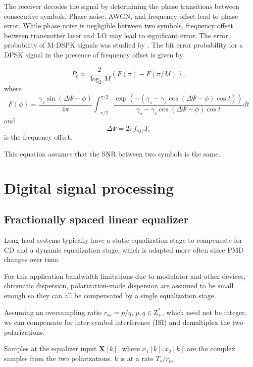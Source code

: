 \documentclass[a4paper]{article}
\begin{document}
The receiver decodes the signal by determining the phase transitions between consecutive symbols. Phase noise, AWGN, and frequency offset lead to phase error. While phase noise is negligible between two symbols, frequency offset between transmitter laser and LO may lead to significant error. The error probability of M-DSPK signals was studied by \cite{Pawula2001}. The bit error probability for a DPSK signal in the presence of frequency offset is given by

\begin{equation}
P_e \approx \frac{2}{\log_2M}(F(\pi) - F(\pi/M)),
\end{equation}
where
\begin{equation}
F(\phi) = \frac{\gamma_s\sin(\Delta\Psi-\phi)}{4\pi}\int_{-\pi/2}^{\pi/2} \frac{\exp(-(\gamma_s -\gamma_s\cos(\Delta\Psi - \phi)\cos t))}{\gamma_s -\gamma_s\cos(\Delta\Psi - \phi)\cos t}dt
\end{equation}
and 
\begin{equation}
\Delta\Psi = 2\pi f_{off}T_s
\end{equation}
is the frequency offset.

This equation assumes that the SNR between two symbols is the same.



\section{Digital signal processing}

\subsection{Fractionally spaced linear equalizer}

Long-haul systems typically have a static equalization stage to compensate for CD and a dynamic equalization stage, which is adapted more often since PMD changes over time.

For this application bandwidth limitations due to modulator and other devices, chromatic dispersion, polarization-mode dispersion are assumed to be small enough so they can all be compensated by a single equalization stage. 

Assuming an oversampling ratio $r_{os} = p/q$, $p, q \in \mathrm{Z^*_+}$, which need not be integer, we can compensate for inter-symbol interference (ISI) and demultiplex the two polarizations.

Samples at the equalizer input $\bm{X}[k]$, where $x_1[k], x_2[k]$ are the complex samples from the two polarizations. $k$ is at a rate $T_s/r_{os}$.
\end{document}
